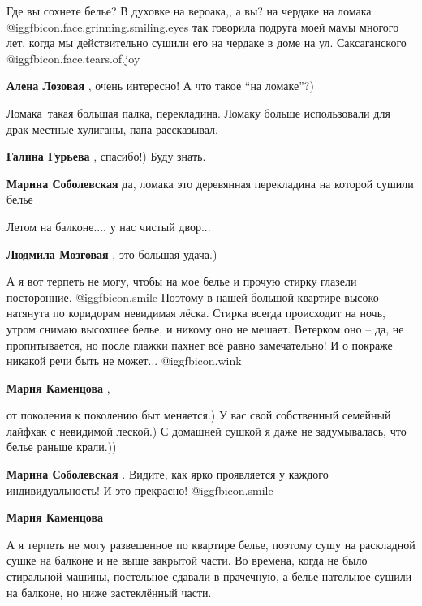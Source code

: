 \begin{itemize}

Где вы сохнете белье? В духовке на вероака,, а вы? на чердаке на ломака @igg{fbicon.face.grinning.smiling.eyes} так
говорила подруга моей мамы многого лет, когда мы действительно сушили его на
чердаке в доме на ул. Саксаганского @igg{fbicon.face.tears.of.joy} 

\begin{itemize} %
\textbf{Алена Лозовая} , очень интересно! А что такое \enquote{на ломаке}?)


Ломака~такая большая палка, перекладина. Ломаку больше использовали для драк
местные хулиганы, папа рассказывал.

\textbf{Галина Гурьева} , спасибо!) Буду знать.

\textbf{Марина Соболевская} да, ломака это деревянная перекладина на которой сушили белье
\end{itemize} %

Летом на балконе.... у нас чистый двор...

\textbf{Людмила Мозговая} , это большая удача.)


А я вот терпеть не могу, чтобы на мое белье и прочую стирку глазели
посторонние.  @igg{fbicon.smile}  Поэтому в нашей большой квартире высоко натянута по коридорам
невидимая лёска. Стирка всегда происходит на ночь, утром снимаю высохшее белье,
и никому оно не мешает. Ветерком оно – да, не пропитывается, но после глажки
пахнет всё равно замечательно! И о покраже никакой речи быть не может...  @igg{fbicon.wink} 

\begin{itemize} %
\textbf{Мария Каменцова} , 

от поколения к поколению быт меняется.) У вас свой собственный семейный лайфхак
с невидимой леской.) С домашней сушкой я даже не задумывалась, что белье раньше
крали.))

\textbf{Марина Соболевская} . Видите, как ярко проявляется у каждого индивидуальность! И это прекрасно!  @igg{fbicon.smile} 

\textbf{Мария Каменцова} 

А я терпеть не могу развешенное по квартире белье, поэтому сушу на раскладной
сушке на балконе и не выше закрытой части. Во времена, когда не было стиральной
машины, постельное сдавали в прачечную, а белье нательное сушили на балконе, но
ниже застеклённый части.


\end{itemize}
\end{itemize}

